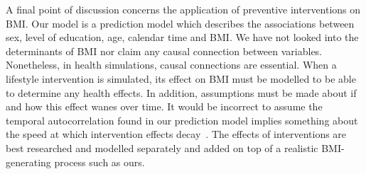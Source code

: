 \documentclass{imammb}
\numberwithin{equation}{section}
\begin{document}
A final point of discussion concerns the application of preventive interventions on BMI. Our model is a prediction model which describes the associations between sex, level of education, age, calendar time and BMI. We have not looked into the determinants of BMI nor claim any causal connection between variables. Nonetheless, in health simulations, causal connections are essential. When a lifestyle intervention is simulated, its effect on BMI must be modelled to be able to determine any health effects. In addition, assumptions must be made about if and how this effect wanes over time. It would be incorrect to assume the temporal autocorrelation found in our prediction model implies something about the speed at which intervention effects decay~\citep{Bayer2011}. The effects of interventions are best researched and modelled separately and added on top of a realistic BMI-generating process such as ours.
\end{document}
